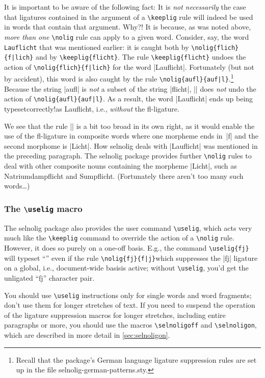 \documentclass[11pt]{article}
\newcommand{\pkg}[1]{\textsf{#1}}
\newcommand{\opt}[1]{\texttt{#1}}
\newcommand{\cmmd}[1]{\texttt{\textbackslash #1}}
\begin{document}
It is important to be aware of the following fact: It is \emph{not necessarily} the case that ligatures contained in the argument of a \cmmd{keeplig} rule will indeed be used in words that contain that argument. Why?! It is because, as was noted above, \emph{more than one} \cmmd{nolig} rule can apply to a given word. Consider, say, the word \opt{Lauf\-licht} that was mentioned earlier: it is caught both by \Verb+\nolig{flich}{f|lich}+ and by \Verb+\keeplig{flicht}+. The rule \Verb+\keeplig{flicht}+ undoes the action of \Verb+\nolig{flich}{f|lich}+ for the word |Lauflicht|. Fortunately (but not by accident), this word is also caught by the rule \Verb+\nolig{aufl}{auf|l}+.\footnote{Recall that the package's German language ligature suppression rules are set up in the file \pkg{selnolig-german-patterns.sty}.} Because the string |aufl| is \emph{not} a subset of the string |flicht|, || does \emph{not} undo the action of \Verb+\nolig{aufl}{auf|l}+. As a result, the word |Lauflicht| ends up being typeset\textemdash correctly!\textemdash as Lauflicht, i.e., \emph{without} the fl-ligature. 

We see that the rule || is a bit too broad in its own right, as it would enable the use of the fl-ligature in composite words where one morpheme ends in~|f| and the second morphome is |Licht|. How \pkg{selnolig} deals with |Lauflicht| was mentioned in the preceding paragraph. The \pkg{selnolig} package provides further \cmmd{nolig} rules to deal with other composite nouns containing the morpheme |Licht|, such as Natriumdampflicht and Sumpflicht. (Fortunately there aren't too many such words\dots)


\subsubsection{The \cmmd{uselig} macro} 
\label{sec:uselig}

The \pkg{selnolig} package also provides the user command \cmmd{uselig}, which acts very much like the \cmmd{keeplig} command to override the action of a \cmmd{nolig} rule. However, it does so purely on a one-off basis. E.g., the command \Verb+\uselig{fj}+ will typeset \enquote{} even if the rule \Verb+\nolig{fj}{f|j}+\textemdash which suppresses the |fj| ligature on a global, i.e., document-wide basis\textemdash is active; without \cmmd{uselig}, you'd get the unligated \enquote{fj} character pair.

You should use \cmmd{uselig} instructions only for single words and word fragments; don't use them for longer stretches of text. If you need to suspend the operation of the ligature suppression macros for longer stretches, including entire paragraphs or more, you should use the macros \cmmd{selnoligoff} and \cmmd{selnoligon}, which are described in more detail in \cref{sec:selnoligon}.
\end{document}
